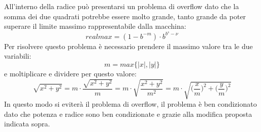 All'interno della radice può presentarsi un problema di overflow dato che la somma dei due quadrati potrebbe essere molto grande, tanto grande da poter superare il limite massimo rappresentabile dalla macchina:
\[
realmax = (1-b^{-m})\cdot b^{b^{s}-\nu}
\]
Per risolvere questo problema è necessario prendere il massimo valore tra le due variabili:
\[
m = max\{|x|,|y|\}
\]
e moltiplicare e dividere per questo valore:
\[
\sqrt{x^2 + y^2} = m\cdot\frac{\sqrt{x^2+y^2}}{m} = m\cdot\sqrt{\frac{x^2+y^2}{m^2}} = m\cdot\sqrt{\biggl(\frac{x}{m}\biggr)^2+\biggl(\frac{y}{m}\biggr)^2}
\]
In questo modo si eviterà il problema di overflow, il problema è ben condizionato dato che potenza e radice sono ben condizionate e grazie alla modifica proposta indicata sopra.